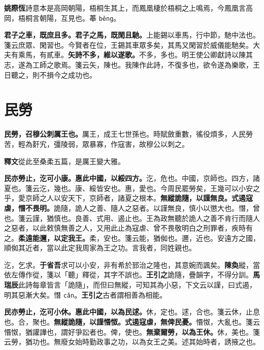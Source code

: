 \begin{quoting}\textbf{姚際恆}詩意本是高岡朝陽，梧桐生其上，而鳳凰棲於梧桐之上鳴焉，今鳳凰言高岡，梧桐言朝陽，互見也。菶 \texttt{běng}。\end{quoting}

\textbf{君子之車，既庶且多。君子之馬，既閑且馳。}{\footnotesize 上能錫以車馬，行中節，馳中法也。箋云庶眾、閑習也。今賢者在位，王錫其車眾多矣，其馬又閑習於威儀能馳矣。大夫有乘馬，有貳車。}\textbf{矢詩不多，維以遂歌。}{\footnotesize 不多，多也。明王使公卿獻詩以陳其志，遂為工師之歌焉。箋云矢，陳也。我陳作此詩，不復多也，欲令遂為樂歌，王日聽之，則不損今之成功也。}

\section{民勞}


\textbf{民勞，召穆公刺厲王也。}{\footnotesize 厲王，成王七世孫也。時賦斂重數，徭役煩多，人民勞苦，輕為姧宄，彊陵弱，眾暴寡，作寇害，故穆公以刺之。}

\begin{quoting}\textbf{釋文}從此至桑柔五篇，是厲王變大雅。\end{quoting}

\textbf{民亦勞止，汔可小康。惠此中國，以綏四方。}{\footnotesize 汔，危也。中國，京師也。四方，諸夏也。箋云汔，幾也。康、綏皆安也。惠，愛也。今周民罷勞矣，王幾可以小安之乎，愛京師之人以安天下，京師者，諸夏之根本。}\textbf{無縱詭隨，以謹無良。式遏寇虐，憯不畏明。}{\footnotesize 詭隨，詭人之善、隨人之惡者。以謹無良，慎小以懲大也。憯，曾也。箋云謹，猶慎也。良善、式用、遏止也。王為政無聽於詭人之善不肯行而隨人之惡者，以此敕慎無善之人，又用此止為寇虐、曾不畏敬明白之刑罪者，疾時有之。}\textbf{柔遠能邇，以定我王。}{\footnotesize 柔，安也。箋云能，猶侞也。邇，近也。安遠方之國，順侞其近者，當以此定我周家為王之功。言我者，同姓親也。}

\begin{quoting}汔，乞求。\textbf{于省吾}求可以小安，非有希於郅治之隆也，其意婉而諷矣。\textbf{陳奐}縱，當依左傳作從，箋以「聽」釋從，其字不誤也。\textbf{王引之}詭隨，疊韻字，不得分訓。\textbf{馬瑞辰}此詩每章皆言「詭隨」，而但曰無縱，可知其為小惡，下文云以謹，曰式遏，明其惡漸大矣。憯 \texttt{cǎn}。\textbf{王引之}古者謂相善為相能。\end{quoting}

\textbf{民亦勞止，汔可小休。惠此中國，以為民逑。}{\footnotesize 休，定也。逑，合也。箋云休，止息也。合，聚也。}\textbf{無縱詭隨，以謹惽怓。式遏寇虐，無俾民憂。}{\footnotesize 惽怓，大亂也。箋云惽怓，猶讙譁也，謂好爭訟者也。俾，使也。}\textbf{無棄爾勞，以為王休。}{\footnotesize 休，美也。箋云勞，猶功也。無廢女始時勤政事之功，以為女王之美。述其始時者，誘掖之也。}

